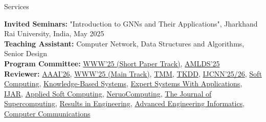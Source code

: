 \documentclass[]{mcdowellcv}
\begin{document}
\vspace*{-12pt}
\begin{cvsection}{Services}
    \begin{cvsubsection}{}{}{}
        \textbf{Invited Seminars:} "Introduction to GNNs and Their Applications", Jharkhand Rai University, India, May 2025\\
        \textbf{Teaching Assistant:} Computer Network, Data Structures and Algorithms, Senior Design\\
        \textbf{Program Committee:} \href{https://www2025.thewebconf.org}{WWW'25 (Short Paper Track)}, \href{https://amlds.site/tpc.html}{AMLDS'25}\\
        \textbf{Reviewer:} \href{https://aaai.org/conference/aaai/aaai-26/}{AAAI'26}, \href{https://www2025.thewebconf.org/}{WWW'25 (Main Track)}, \href{https://ieeexplore.ieee.org/xpl/RecentIssue.jsp?punumber=6046}{TMM}, \href{https://dl.acm.org/journal/tkdd}{TKDD}, \href{https://2025.ijcnn.org/}{IJCNN'25/26}, \href{https://link.springer.com/journal/500}{Soft Computing}, \href{https://www.sciencedirect.com/journal/knowledge-based-systems}{Knowledge-Based Systems}, \href{https://www.sciencedirect.com/journal/expert-systems-with-applications}{Expert Systems With Applications}, \href{https://www.sciencedirect.com/journal/international-journal-of-approximate-reasoning}{IJAR}, \href{https://www.sciencedirect.com/journal/applied-soft-computing}{Applied Soft Computing}, \href{https://www.sciencedirect.com/journal/neurocomputing}{NeruoComputing}, \href{https://link.springer.com/journal/11227}{The Journal of Supercomputing}, \href{https://www.sciencedirect.com/journal/results-in-engineering}{Results in Engineering}, \href{https://www.sciencedirect.com/journal/advanced-engineering-informatics}{Advanced Engineering Informatics}, \href{https://www.sciencedirect.com/journal/computer-communications}{Computer Communications}\\

\end{cvsubsection}
\end{cvsection}
\end{document}
